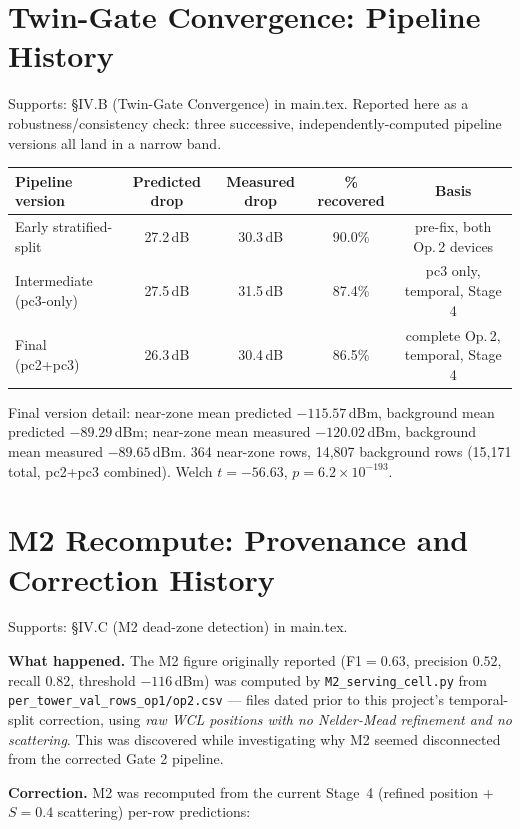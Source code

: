 \documentclass[11pt]{article}
\begin{document}
\section{Twin-Gate Convergence: Pipeline History}
\label{sec:convergence_history}

Supports: \S IV.B (Twin-Gate Convergence) in main.tex. Reported here as a
robustness/consistency check: three successive, independently-computed
pipeline versions all land in a narrow band.

\begin{table}[h]
\centering
\small
\begin{tabular}{lcccc}
\toprule
Pipeline version & Predicted drop & Measured drop & \% recovered & Basis \\
\midrule
Early stratified-split & 27.2\,dB & 30.3\,dB & 90.0\% & pre-fix, both Op.\,2 devices \\
Intermediate (pc3-only) & 27.5\,dB & 31.5\,dB & 87.4\% & pc3 only, temporal, Stage 4 \\
Final (pc2+pc3) & 26.3\,dB & 30.4\,dB & 86.5\% & complete Op.\,2, temporal, Stage 4 \\
\bottomrule
\end{tabular}
\end{table}

Final version detail: near-zone mean predicted $-115.57$\,dBm, background
mean predicted $-89.29$\,dBm; near-zone mean measured $-120.02$\,dBm,
background mean measured $-89.65$\,dBm. 364 near-zone rows, 14{,}807
background rows (15{,}171 total, pc2+pc3 combined). Welch $t=-56.63$,
$p=6.2\times10^{-193}$.

\section{M2 Recompute: Provenance and Correction History}
\label{sec:m2history}

Supports: \S IV.C (M2 dead-zone detection) in main.tex.

\textbf{What happened.} The M2 figure originally reported (F1$=0.63$,
precision $0.52$, recall $0.82$, threshold $-116$\,dBm) was computed by
\texttt{M2\_serving\_cell.py} from \texttt{per\_tower\_val\_rows\_op1/op2.csv}
— files dated prior to this project's temporal-split correction, using
\emph{raw WCL positions with no Nelder-Mead refinement and no
scattering}. This was discovered while investigating why M2 seemed
disconnected from the corrected Gate 2 pipeline.

\textbf{Correction.} M2 was recomputed from the current Stage~4
(refined position + $S=0.4$ scattering) per-row predictions:
\end{document}
